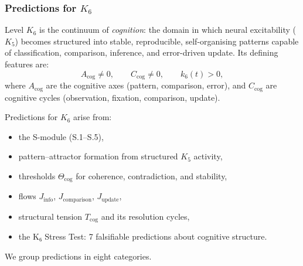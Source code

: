 

\subsubsection{Predictions for \texorpdfstring{$K_6$}{K_6}}
\label{sec:predictions-k6}

Level $K_6$ is the continuum of \emph{cognition}: the domain in which
neural excitability ($K_5$) becomes structured into stable, reproducible,
self-organising patterns capable of classification, comparison, inference,
and error-driven update.
Its defining features are:
\[
A_{\mathrm{cog}} \neq 0, \qquad
C_{\mathrm{cog}} \neq 0, \qquad
k_6(t) > 0,
\]
where $A_{\mathrm{cog}}$ are the cognitive axes (pattern, comparison, error),
and $C_{\mathrm{cog}}$ are cognitive cycles (observation, fixation, comparison,
update).

Predictions for $K_6$ arise from:
\begin{itemize}
    \item the S-module (S.1--S.5),
    \item pattern–attractor formation from structured $K_5$ activity,
    \item thresholds $\Theta_{\mathrm{cog}}$ for coherence, contradiction, and stability,
    \item flows $J_{\mathrm{info}}$, $J_{\mathrm{comparison}}$, $J_{\mathrm{update}}$,
    \item structural tension $T_{\mathrm{cog}}$ and its resolution cycles,
    \item the K₆ Stress Test: 7 falsifiable predictions about cognitive structure.
\end{itemize}

We group predictions in eight categories.

